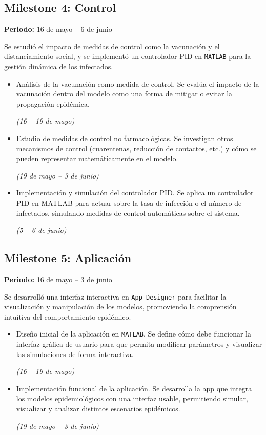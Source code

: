 \subsection*{Milestone 4: Control}
\textbf{Periodo:} 16 de mayo – 6 de junio

Se estudió el impacto de medidas de control como la vacunación y el distanciamiento social, y se implementó un controlador PID en \texttt{MATLAB} para la gestión dinámica de los infectados.

\begin{itemize}
    \item Análisis de la vacunación como medida de control. Se evalúa el impacto de la vacunación dentro del modelo como una forma de mitigar o evitar la propagación epidémica. 
    
    \textit{(16 – 19 de mayo)}
    \item Estudio de medidas de control no farmacológicas. Se investigan otros mecanismos de control (cuarentenas, reducción de contactos, etc.) y cómo se pueden representar matemáticamente en el modelo. 
    
    \textit{(19 de mayo – 3 de junio)}
    \item Implementación y simulación del controlador PID. Se aplica un controlador PID en MATLAB para actuar sobre la tasa de infección o el número de infectados, simulando medidas de control automáticas sobre el sistema.
    
    \textit{(5 – 6 de junio)}
\end{itemize}

\subsection*{Milestone 5: Aplicación}
\textbf{Periodo:} 16 de mayo – 3 de junio

Se desarrolló una interfaz interactiva en \texttt{App Designer} para facilitar la visualización y manipulación de los modelos, promoviendo la comprensión intuitiva del comportamiento epidémico.

\begin{itemize}
    \item Diseño inicial de la aplicación en \texttt{MATLAB}. Se define cómo debe funcionar la interfaz gráfica de usuario para que permita modificar parámetros y visualizar las simulaciones de forma interactiva.
    
    \textit{(16 – 19 de mayo)}
    \item Implementación funcional de la aplicación. Se desarrolla la app que integra los modelos epidemiológicos con una interfaz usable, permitiendo simular, visualizar y analizar distintos escenarios epidémicos.

    \textit{(19 de mayo – 3 de junio)}
\end{itemize}

